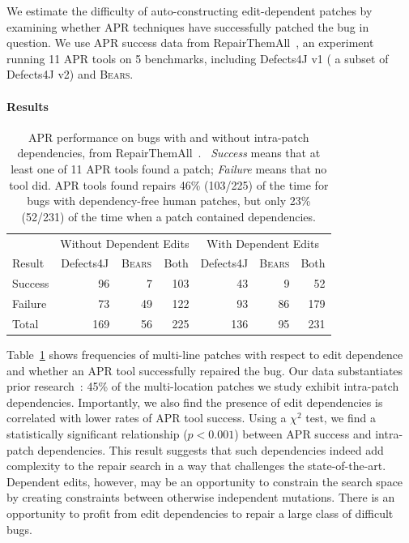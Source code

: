 \documentclass[10pt, conference]{IEEEtran}
\newcommand\bears{\textsc{Bears}\xspace}
\begin{document}
We estimate the difficulty of auto-constructing edit-dependent patches 
by examining whether APR techniques have successfully patched the
bug in question. We use APR success data from 
RepairThemAll~\cite{durieux-repair-them-all}, an experiment 
running 11 APR tools on 5 benchmarks, including Defects4J v1
( a subset of Defects4J v2) and \bears.

\paragraph{Results}

\begin{table}
{\begin{center}
    \begin{tabular}{lrrrrrr}
        \toprule
        &\multicolumn{3}{c}{Without Dependent Edits} & \multicolumn{3}{c}{With Dependent Edits} \\
        Result& \multicolumn{1}{c}{Defects4J} & \multicolumn{1}{c}{\bears} & \multicolumn{1}{c}{Both} & \multicolumn{1}{c}{Defects4J} & \multicolumn{1}{c}{\bears} & \multicolumn{1}{c}{Both} \\
        \midrule
        Success & 96 & 7 & 103 & 43 & 9 &  52 \\
        Failure & 73 & 49 & 122 & 93 & 86 & 179\\
        \midrule
        Total  & 169 & 56 & 225 & 136 & 95 & 231\\
        \bottomrule
    \end{tabular}
 \end{center}
}	\caption{\small APR performance on bugs with and without intra-patch 
      dependencies, from RepairThemAll~\cite{durieux-repair-them-all}.\protect\footnotemark
      \ \emph{Success} means that at least one of 11 APR tools found a patch; 
      \emph{Failure} means that no tool did.  APR tools found repairs 46\%
      (103/225) of the time for bugs with dependency-free human patches, but only
      23\% (52/231) of the time when a patch contained dependencies.}
	\label{tab:dependency-repair-contingency-table}
\end{table}

Table~\ref{tab:dependency-repair-contingency-table}
shows frequencies of multi-line patches with respect to edit dependence 
and whether an APR tool successfully repaired the bug.
Our data substantiates prior research~\cite{zhong2015}:
45\% of the multi-location patches we study exhibit intra-patch dependencies. 
Importantly, 
we also find the presence of edit dependencies is correlated with lower rates of
APR tool success. 
Using a $\chi^2$ test, we find a statistically significant relationship ($p < 0.001$)
between APR success and intra-patch dependencies.
This result 
suggests that such dependencies indeed 
add complexity to the repair search in a way that challenges the state-of-the-art.
Dependent edits, however, may 
be an opportunity to constrain the search space by creating constraints between 
otherwise independent mutations.  There is an opportunity to profit from edit 
dependencies to repair a large class of difficult bugs.
\end{document}

